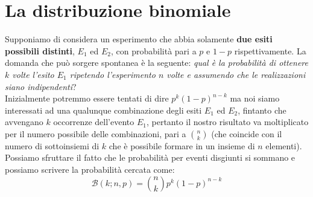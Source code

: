 \documentclass{report}
\begin{document}
\section{La distribuzione binomiale}
Supponiamo di considera un esperimento che abbia solamente \textbf{due esiti possibili distinti}, $E_1$ ed $E_2$, con probabilità pari a $p$ e $1-p$ rispettivamente. La domanda che può sorgere spontanea è la seguente: \emph{qual è la probabilità di ottenere $k$ volte l'esito $E_1$ ripetendo l'esperimento $n$ volte e assumendo che le realizzazioni siano indipendenti}? \\
Inizialmente potremmo essere tentati di dire $p^k(1-p)^{n-k}$ ma noi siamo interessati ad una qualunque combinazione degli esiti $E_1$ ed $E_2$, fintanto che avvengano $k$ occorrenze dell'evento $E_1$, pertanto il nostro risultato va moltiplicato per il numero possibile delle combinazioni, pari a $\binom{n}{k}$ (che coincide con il numero di sottoinsiemi di $k$ che è possibile formare in un insieme di $n$ elementi). Possiamo sfruttare il fatto che le probabilità per eventi disgiunti si sommano e possiamo scrivere la probabilità cercata come:
\begin{equation}
	\mathcal{B}(k; n, p) = \binom{n}{k} p^k (1-p)^{n-k}
\end{equation}
\end{document}
